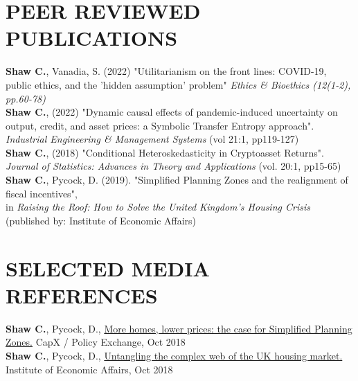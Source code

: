 \documentclass[letterpaper,11pt]{article}
\begin{document}
\section{PEER REVIEWED PUBLICATIONS}
 \begin{itemize}[leftmargin=0in, label={}]
\small{\item{
\textbf{Shaw C.}, Vanadia, S. (2022) "Utilitarianism on the front lines: COVID-19, public ethics, and the 'hidden assumption' problem" \textit{Ethics \& Bioethics (12(1-2), pp.60-78)} \\
\textbf{Shaw C.}, (2022) "Dynamic causal effects of pandemic-induced uncertainty on output, credit, and asset prices: a Symbolic Transfer Entropy approach". \textit{Industrial Engineering \& Management Systems} (vol 21:1, pp119-127)\\
\textbf{Shaw C.}, (2018) "Conditional Heteroskedasticity in Cryptoasset Returns". \textit{Journal of Statistics: Advances in Theory and Applications} (vol. 20:1, pp15-65) \\
\textbf{Shaw C.}, Pycock, D. (2019). "Simplified Planning Zones and the realignment of fiscal incentives", \\
in \textit{Raising the Roof: How to Solve the United Kingdom's Housing Crisis} (published by: Institute of Economic Affairs)
    
    }}
 \end{itemize}

\section{SELECTED MEDIA REFERENCES}
 \begin{itemize}[leftmargin=0in, label={}]
\small{\item{ 
\textbf{Shaw C.}, Pycock, D., \href{https://capx.co/more-homes-lower-prices-the-case-for-simplified-planning-zones/}{More homes, lower prices: the case for Simplified Planning Zones.} CapX / Policy Exchange, Oct 2018 \vspace{2pt} \\
 \textbf{Shaw C.}, Pycock, D., \href{https://iea.org.uk/untangling-the-complex-web-of-the-uk-housing-market/}{Untangling the complex web of the UK housing market.} Institute of Economic Affairs, Oct 2018 
    }}
 \end{itemize}

\end{document}
